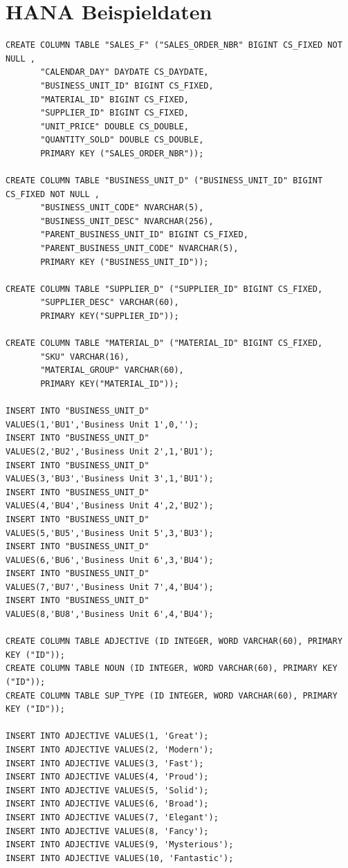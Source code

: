 \section{HANA Beispieldaten}

\begin{lstlisting}
CREATE COLUMN TABLE "SALES_F" ("SALES_ORDER_NBR" BIGINT CS_FIXED NOT NULL ,
       "CALENDAR_DAY" DAYDATE CS_DAYDATE,
       "BUSINESS_UNIT_ID" BIGINT CS_FIXED,
       "MATERIAL_ID" BIGINT CS_FIXED,
       "SUPPLIER_ID" BIGINT CS_FIXED,
       "UNIT_PRICE" DOUBLE CS_DOUBLE,
       "QUANTITY_SOLD" DOUBLE CS_DOUBLE,
       PRIMARY KEY ("SALES_ORDER_NBR"));

CREATE COLUMN TABLE "BUSINESS_UNIT_D" ("BUSINESS_UNIT_ID" BIGINT CS_FIXED NOT NULL ,
       "BUSINESS_UNIT_CODE" NVARCHAR(5),
       "BUSINESS_UNIT_DESC" NVARCHAR(256),
       "PARENT_BUSINESS_UNIT_ID" BIGINT CS_FIXED,
       "PARENT_BUSINESS_UNIT_CODE" NVARCHAR(5),
       PRIMARY KEY ("BUSINESS_UNIT_ID"));

CREATE COLUMN TABLE "SUPPLIER_D" ("SUPPLIER_ID" BIGINT CS_FIXED,
       "SUPPLIER_DESC" VARCHAR(60),
       PRIMARY KEY("SUPPLIER_ID"));

CREATE COLUMN TABLE "MATERIAL_D" ("MATERIAL_ID" BIGINT CS_FIXED,
       "SKU" VARCHAR(16),
       "MATERIAL_GROUP" VARCHAR(60),
       PRIMARY KEY("MATERIAL_ID"));
 
INSERT INTO "BUSINESS_UNIT_D"
VALUES(1,'BU1','Business Unit 1',0,'');
INSERT INTO "BUSINESS_UNIT_D"
VALUES(2,'BU2','Business Unit 2',1,'BU1');
INSERT INTO "BUSINESS_UNIT_D"
VALUES(3,'BU3','Business Unit 3',1,'BU1');
INSERT INTO "BUSINESS_UNIT_D"
VALUES(4,'BU4','Business Unit 4',2,'BU2');
INSERT INTO "BUSINESS_UNIT_D"
VALUES(5,'BU5','Business Unit 5',3,'BU3');
INSERT INTO "BUSINESS_UNIT_D"
VALUES(6,'BU6','Business Unit 6',3,'BU4');
INSERT INTO "BUSINESS_UNIT_D"
VALUES(7,'BU7','Business Unit 7',4,'BU4');
INSERT INTO "BUSINESS_UNIT_D"
VALUES(8,'BU8','Business Unit 6',4,'BU4');
 
CREATE COLUMN TABLE ADJECTIVE (ID INTEGER, WORD VARCHAR(60), PRIMARY KEY ("ID"));
CREATE COLUMN TABLE NOUN (ID INTEGER, WORD VARCHAR(60), PRIMARY KEY ("ID"));
CREATE COLUMN TABLE SUP_TYPE (ID INTEGER, WORD VARCHAR(60), PRIMARY KEY ("ID"));
 
INSERT INTO ADJECTIVE VALUES(1, 'Great');
INSERT INTO ADJECTIVE VALUES(2, 'Modern');
INSERT INTO ADJECTIVE VALUES(3, 'Fast');
INSERT INTO ADJECTIVE VALUES(4, 'Proud');
INSERT INTO ADJECTIVE VALUES(5, 'Solid');
INSERT INTO ADJECTIVE VALUES(6, 'Broad');
INSERT INTO ADJECTIVE VALUES(7, 'Elegant');
INSERT INTO ADJECTIVE VALUES(8, 'Fancy');
INSERT INTO ADJECTIVE VALUES(9, 'Mysterious');
INSERT INTO ADJECTIVE VALUES(10, 'Fantastic');
 

\end{lstlisting}
